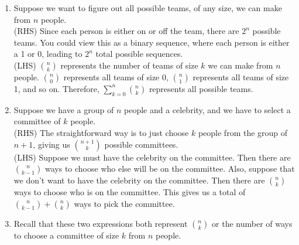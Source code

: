 \documentclass[11pt]{article}
\begin{document}
\begin{solution}{4}
\begin{enumerate}
    \item Suppose we want to figure out all possible
    teams, of any size, we can make from $n$ people. \\
    
    (RHS) Since each person is either on or off
    the team, there are $2^n$ possible teams. You
    could view this as a binary sequence, where
    each person is either a 1 or 0, leading to 
    $2^n$ total possible sequences. \\
    
    (LHS) ${n \choose k}$ represents the number
    of teams of size $k$ we can make from $n$ people.
    ${n \choose 0}$ represents all teams of size 0,
    ${n \choose 1}$ represents all teams of size 1,
    and so on. Therefore, $\sum_{k=0}^n {n \choose k}$ represents all possible teams. 
    \item Suppose we have a group of $n$ people and
    a celebrity, and we have to select a committee
    of $k$ people.\\
    
    (RHS) The straightforward way is to just 
    choose $k$ people from the group of $n+1$, 
    giving us ${n+1 \choose k}$ possible 
    committees.\\
    
    (LHS) Suppose we must have the celebrity on the 
    committee. Then there are ${n \choose k-1}$ 
    ways to choose who else will be on the committee.
    Also, suppose that we don't want to have
    the celebrity on the committee. Then there
    are ${n \choose k}$ ways to choose who 
    is on the committee. This gives us a total
    of ${n \choose k-1} + {n \choose k}$ ways
    to pick the committee. 
    \item Recall that these two expressions both
    represent ${n \choose k}$ or the number 
    of ways to choose a committee of size $k$ from
    $n$ people. \\
    

\end{enumerate}
\end{solution}
\end{document}
